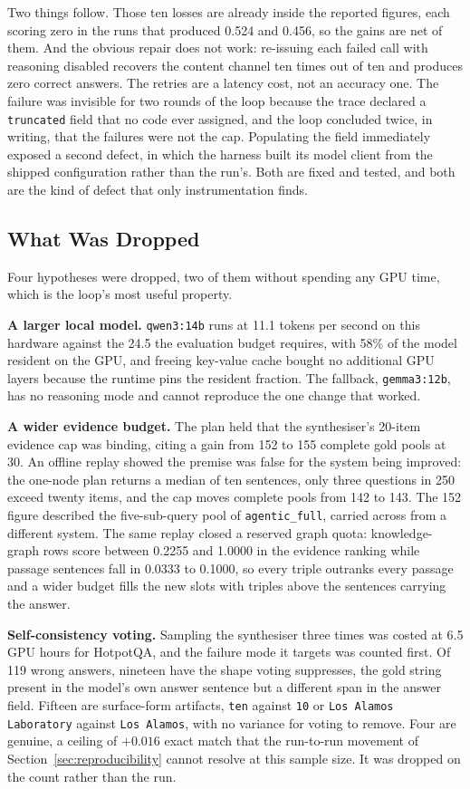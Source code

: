 Two things follow. Those ten losses are already inside the reported figures,
each scoring zero in the runs that produced 0.524 and 0.456, so the gains are
net of them. And the obvious repair does not work: re-issuing each failed call
with reasoning disabled recovers the content channel ten times out of ten and
produces zero correct answers. The retries are a latency cost, not an accuracy
one. The failure was invisible for two rounds of the loop because the trace
declared a \texttt{truncated} field that no code ever assigned, and the loop
concluded twice, in writing, that the failures were not the cap. Populating
the field immediately exposed a second defect, in which the harness built its
model client from the shipped configuration rather than the run's. Both are
fixed and tested, and both are the kind of defect that only instrumentation
finds.

\subsection{What Was Dropped}

Four hypotheses were dropped, two of them without spending any GPU time, which
is the loop's most useful property.

\textbf{A larger local model.} \texttt{qwen3:14b} runs at 11.1 tokens per
second on this hardware against the 24.5 the evaluation budget requires, with
58\% of the model resident on the GPU, and freeing key-value cache bought no
additional GPU layers because the runtime pins the resident fraction. The
fallback, \texttt{gemma3:12b}, has no reasoning mode and cannot reproduce the
one change that worked.

\textbf{A wider evidence budget.} The plan held that the synthesiser's 20-item
evidence cap was binding, citing a gain from 152 to 155 complete gold pools at
30. An offline replay showed the premise was false for the system being
improved: the one-node plan returns a median of ten sentences, only three
questions in 250 exceed twenty items, and the cap moves complete pools from
142 to 143. The 152 figure described the five-sub-query pool of
\texttt{agentic\_full}, carried across from a different system. The same
replay closed a reserved graph quota: knowledge-graph rows score between
0.2255 and 1.0000 in the evidence ranking while passage sentences fall in
0.0333 to 0.1000, so every triple outranks every passage and a wider budget
fills the new slots with triples above the sentences carrying the answer.

\textbf{Self-consistency voting.} Sampling the synthesiser three times was
costed at 6.5 GPU hours for HotpotQA, and the failure mode it targets was
counted first. Of 119 wrong answers, nineteen have the shape voting
suppresses, the gold string present in the model's own answer sentence but a
different span in the answer field. Fifteen are surface-form artifacts,
\texttt{ten} against \texttt{10} or \texttt{Los Alamos Laboratory} against
\texttt{Los Alamos}, with no variance for voting to remove. Four are genuine,
a ceiling of $+0.016$ exact match that the run-to-run movement of
Section~\ref{sec:reproducibility} cannot resolve at this sample size. It was
dropped on the count rather than the run.

